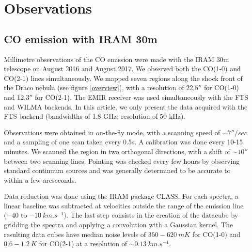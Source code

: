 \documentclass[traditabstract]{aa}
\begin{document}
\section{Observations}
\label{sec:Obs}

   \subsection{CO emission with IRAM 30m}

   Millimetre observations of the CO emission were made with the IRAM 30m telescope on August 2016 and August 2017. We observed both the CO(1-0) and CO(2-1) lines simultaneously. We mapped seven regions along the shock front of the Draco nebula (see figure \ref{overview}), with a resolution of $22.5''$ for CO(1-0) and $12.3''$ for CO(2-1). The EMIR receiver was used simultaneously with the FTS and WILMA backends. In this article, we only present the data acquired with the FTS backend (bandwidths of 1.8 GHz; resolution of 50 kHz).

   Observations were obtained in on-the-fly mode, with a scanning speed of $\sim 7''/sec$ and a sampling of one scan taken every 0.5s. A calibration was done every 10-15 minutes. We scanned the region in two orthogonal directions, with a shift of $\sim 10''$ between two scanning lines. Pointing was checked every few hours by observing standard continuum sources and was generally determined to be accurate to within a few arcseconds.

   Data reduction was done using the IRAM package CLASS. For each spectra, a linear baseline was subtracted at velocities outside the range of the emission line ($-40$ to $-10\: km.s^{-1}$). The last step consists in the creation of the datacube by gridding the spectra and applying a convolution with a Gaussian kernel. The resulting data cubes have median noise levels of $350-620\: mK$ for CO(1-0) and $0.6-1.2\: K$ for CO(2-1) at a resolution of $\sim 0.13\: km.s^{-1}$.
\end{document}
